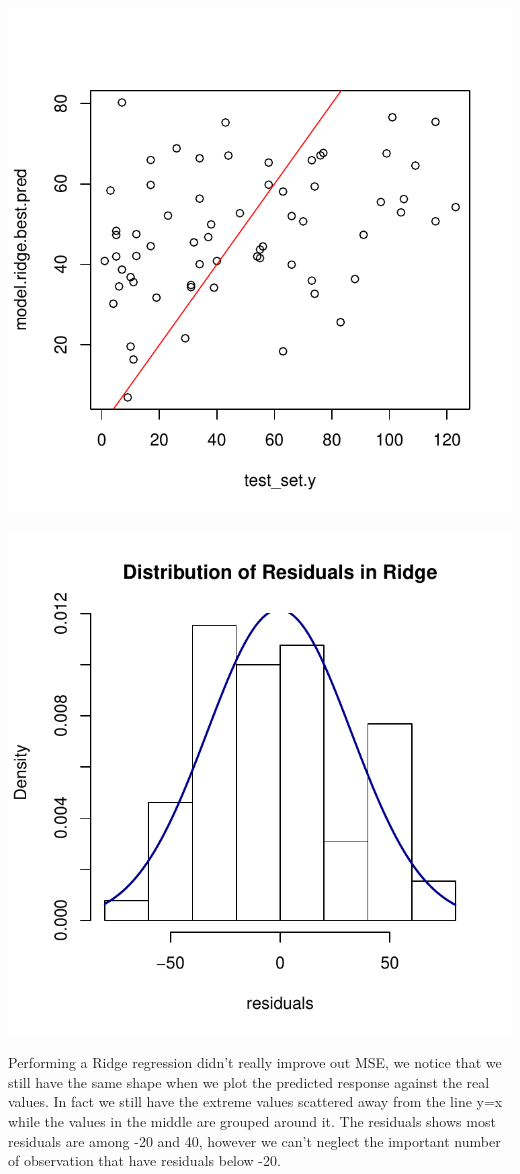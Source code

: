 \documentclass[]{report}
\begin{document}
\begin{center}
	\includegraphics[width=0.8\linewidth]{Figures/ridge_yhat.pdf}
	\label{fig:ridhe_yhat}
\end{center}

\begin{center}
	\includegraphics[width=0.8\linewidth]{Figures/ridge_resid.pdf}
	\label{fig:ridge_resid}
\end{center}

Performing a Ridge regression didn't really improve out MSE, we notice that we still have the same shape when we plot the predicted response against the real values. In fact we still have the extreme values scattered away from the line y=x while the values in the middle are grouped around it. The residuals shows most residuals are among -20 and 40, however we can't neglect the important number of observation that have residuals below -20.\\
\end{document}
